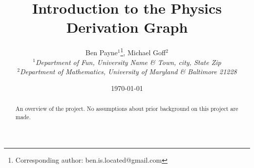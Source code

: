 \documentclass{article}
\newcommand{\pdg}{Physics Derivation Graph}
\begin{document}
\title{Introduction to the \pdg}

\author{Ben Payne$^{1}$\footnote{Corresponding author: ben.is.located@gmail.com}, Michael Goff$^{2}$\\
{\it $^{1}$Department of Fun, University Name \& Town, city, State Zip}\\
{\it $^{2}$Department of Mathematics, University of Maryland \& Baltimore 21228}}

\date{\today}

\maketitle %
\begin{abstract}
An overview of the project. No assumptions about prior background on this project are made.
\end{abstract}
\end{document}

